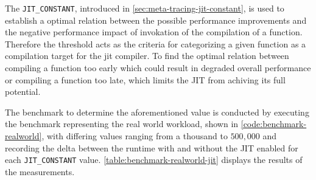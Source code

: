 The \texttt{JIT\_CONSTANT}, introduced in
\autoref{sec:meta-tracing-jit-constant}, is used to establish a optimal
relation between the possible performance improvements and the negative
performance impact of invokation of the compilation of a function. Therefore
the threshold acts as the criteria for categorizing a given function as a
compilation target for the jit compiler. To find the optimal relation between
compiling a function too early which could result in degraded overall
performance or compiling a function too late, which limits the JIT from
achiving its full potential.

The benchmark to determine the aforementioned value is conducted by executing
the benchmark representing the real world workload, shown in
\autoref{code:benchmark-realworld}, with differing values ranging from a
thousand to $500,000$ and recording the delta between the runtime with and
without the JIT enabled for each \texttt{JIT\_CONSTANT} value.
\autoref{table:benchmark-realworld-jit} displays the results of the
measurements.


